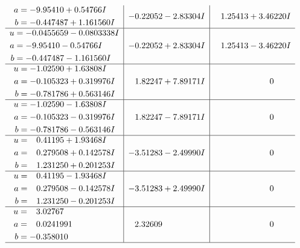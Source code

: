 \documentclass[1p]{elsarticle_modified}
\theoremstyle{definition}
\begin{document}
$$\begin{array}{c|c|c}
\begin{aligned}
a &= -9.95410 + 0.54766 I \\
b &= -0.447487 + 1.161560 I\end{aligned}
 & -0.22052 - 2.83304 I & \phantom{-}1.25413 + 3.46220 I \\ \hline\begin{aligned}
u &= -0.0455659 - 0.0803338 I \\
a &= -9.95410 - 0.54766 I \\
b &= -0.447487 - 1.161560 I\end{aligned}
 & -0.22052 + 2.83304 I & \phantom{-}1.25413 - 3.46220 I \\ \hline\begin{aligned}
u &= -1.02590 + 1.63808 I \\
a &= -0.105323 + 0.319976 I \\
b &= -0.781786 + 0.563146 I\end{aligned}
 & \phantom{-}1.82247 + 7.89171 I & \phantom{-0.000000 } 0 \\ \hline\begin{aligned}
u &= -1.02590 - 1.63808 I \\
a &= -0.105323 - 0.319976 I \\
b &= -0.781786 - 0.563146 I\end{aligned}
 & \phantom{-}1.82247 - 7.89171 I & \phantom{-0.000000 } 0 \\ \hline\begin{aligned}
u &= \phantom{-}0.41195 + 1.93468 I \\
a &= \phantom{-}0.279508 + 0.142578 I \\
b &= \phantom{-}1.231250 + 0.201253 I\end{aligned}
 & -3.51283 - 2.49990 I & \phantom{-0.000000 } 0 \\ \hline\begin{aligned}
u &= \phantom{-}0.41195 - 1.93468 I \\
a &= \phantom{-}0.279508 - 0.142578 I \\
b &= \phantom{-}1.231250 - 0.201253 I\end{aligned}
 & -3.51283 + 2.49990 I & \phantom{-0.000000 } 0 \\ \hline\begin{aligned}
u &= \phantom{-}3.02767\phantom{ +0.000000I} \\
a &= \phantom{-}0.0241991\phantom{ +0.000000I} \\
b &= -0.358010\phantom{ +0.000000I}\end{aligned}
 & \phantom{-}2.32609\phantom{ +0.000000I} & \phantom{-0.000000 } 0\\
 \hline 
 \end{array}$$\newpage\newpage\renewcommand{\arraystretch}{1}
\end{document}
